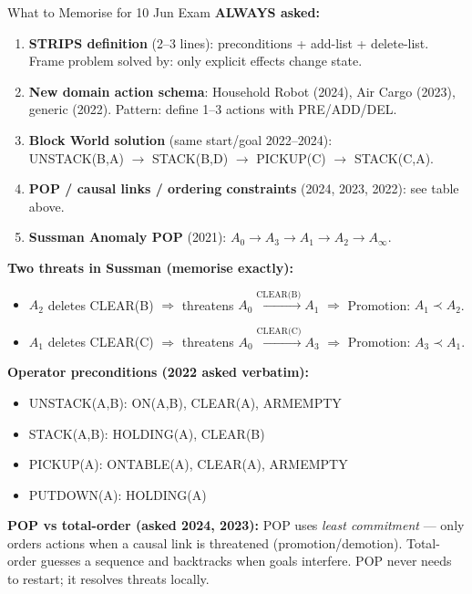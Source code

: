 \documentclass[12pt,a4paper]{article}
\begin{document}
\begin{keybox}{What to Memorise for 10 Jun Exam}
\textbf{ALWAYS asked:}
\begin{enumerate}[noitemsep]
  \item \textbf{STRIPS definition} (2--3 lines): preconditions + add-list + delete-list.
    Frame problem solved by: only explicit effects change state.
  \item \textbf{New domain action schema}: Household Robot (2024), Air Cargo (2023),
    generic (2022). Pattern: define 1--3 actions with PRE/ADD/DEL.
  \item \textbf{Block World solution} (same start/goal 2022--2024):\\
    UNSTACK(B,A) $\to$ STACK(B,D) $\to$ PICKUP(C) $\to$ STACK(C,A).
  \item \textbf{POP / causal links / ordering constraints} (2024, 2023, 2022): see table above.
  \item \textbf{Sussman Anomaly POP} (2021): $A_0 \to A_3 \to A_1 \to A_2 \to A_\infty$.
\end{enumerate}

\medskip
\textbf{Two threats in Sussman (memorise exactly):}
\begin{itemize}[noitemsep]
  \item $A_2$ deletes CLEAR(B) $\Rightarrow$ threatens $A_0\xrightarrow{\text{CLEAR(B)}}A_1$
    $\Rightarrow$ Promotion: $A_1 \prec A_2$.
  \item $A_1$ deletes CLEAR(C) $\Rightarrow$ threatens $A_0\xrightarrow{\text{CLEAR(C)}}A_3$
    $\Rightarrow$ Promotion: $A_3 \prec A_1$.
\end{itemize}

\medskip
\textbf{Operator preconditions (2022 asked verbatim):}
\begin{itemize}[noitemsep]
  \item UNSTACK(A,B): ON(A,B), CLEAR(A), ARMEMPTY
  \item STACK(A,B): HOLDING(A), CLEAR(B)
  \item PICKUP(A): ONTABLE(A), CLEAR(A), ARMEMPTY
  \item PUTDOWN(A): HOLDING(A)
\end{itemize}

\medskip
\textbf{POP vs total-order (asked 2024, 2023):}
POP uses \textit{least commitment} --- only orders actions when a causal link is threatened
(promotion/demotion). Total-order guesses a sequence and backtracks when goals interfere.
POP never needs to restart; it resolves threats locally.
\end{keybox}
\end{document}
